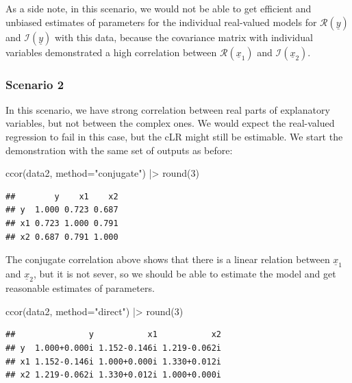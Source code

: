 \documentclass[
]{book}
\newenvironment{Shaded}{\begin{snugshade}}{\end{snugshade}}
\newcommand{\AttributeTok}[1]{\textcolor[rgb]{0.77,0.63,0.00}{#1}}
\newcommand{\DecValTok}[1]{\textcolor[rgb]{0.00,0.00,0.81}{#1}}
\newcommand{\FunctionTok}[1]{\textcolor[rgb]{0.00,0.00,0.00}{#1}}
\newcommand{\NormalTok}[1]{#1}
\newcommand{\SpecialCharTok}[1]{\textcolor[rgb]{0.00,0.00,0.00}{#1}}
\newcommand{\StringTok}[1]{\textcolor[rgb]{0.31,0.60,0.02}{#1}}
\begin{document}
As a side note, in this scenario, we would not be able to get efficient and unbiased estimates of parameters for the individual real-valued models for \(\mathcal{R}\left(\underline{y}\right)\) and \(\mathcal{I}\left(\underline{y}\right)\) with this data, because the covariance matrix with individual variables demonstrated a high correlation between \(\mathcal{R}\left(\underline{x}_1\right)\) and \(\mathcal{I}\left(\underline{x}_2\right)\).

\hypertarget{scenario-2}{%
\subsubsection*{Scenario 2}\label{scenario-2}}

In this scenario, we have strong correlation between real parts of explanatory variables, but not between the complex ones. We would expect the real-valued regression to fail in this case, but the cLR might still be estimable. We start the demonstration with the same set of outputs as before:

\begin{Shaded}
\begin{Highlighting}[]
\FunctionTok{ccor}\NormalTok{(data2, }\AttributeTok{method=}\StringTok{"conjugate"}\NormalTok{) }\SpecialCharTok{|\textgreater{}} \FunctionTok{round}\NormalTok{(}\DecValTok{3}\NormalTok{)}
\end{Highlighting}
\end{Shaded}

\begin{verbatim}
##        y    x1    x2
## y  1.000 0.723 0.687
## x1 0.723 1.000 0.791
## x2 0.687 0.791 1.000
\end{verbatim}

The conjugate correlation above shows that there is a linear relation between \(\underline{x}_{1}\) and \(\underline{x}_{2}\), but it is not sever, so we should be able to estimate the model and get reasonable estimates of parameters.

\begin{Shaded}
\begin{Highlighting}[]
\FunctionTok{ccor}\NormalTok{(data2, }\AttributeTok{method=}\StringTok{"direct"}\NormalTok{) }\SpecialCharTok{|\textgreater{}} \FunctionTok{round}\NormalTok{(}\DecValTok{3}\NormalTok{)}
\end{Highlighting}
\end{Shaded}

\begin{verbatim}
##               y           x1           x2
## y  1.000+0.000i 1.152-0.146i 1.219-0.062i
## x1 1.152-0.146i 1.000+0.000i 1.330+0.012i
## x2 1.219-0.062i 1.330+0.012i 1.000+0.000i
\end{verbatim}
\end{document}

